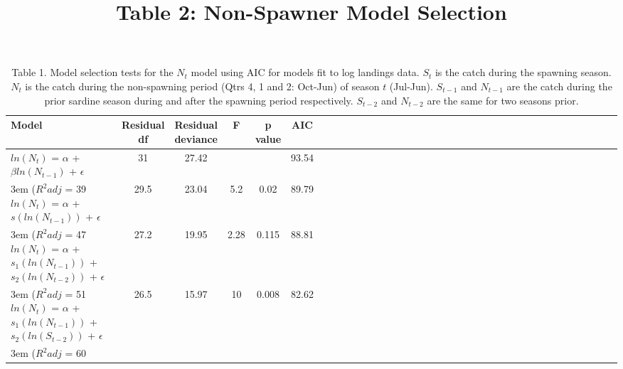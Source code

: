 \documentclass[]{article}
\title{Table 2: Non-Spawner Model Selection}
\author{}
\date{}
\begin{document}
\maketitle

\begin{table}[t]

\caption{\label{tab:print-table2}Table 1. Model selection tests for the $N_t$ model using AIC for models fit to log landings data.  $S_t$ is the catch during the spawning season. $N_t$ is the catch during the non-spawning period (Qtrs 4, 1 and 2: Oct-Jun) of season $t$ (Jul-Jun). $S_{t-1}$ and $N_{t-1}$ are the catch during the prior sardine season during and after the spawning period respectively. $S_{t-2}$ and $N_{t-2}$ are the same for two seasons prior.}
\centering
\begin{tabular}{lccccc|lccccc|lccccc|lccccc|lccccc|lccccc}
\hline
Model & \shortstack{Residual\\df} & \shortstack{Residual\\deviance} & F & \shortstack{p\\value} & AIC\\
\hline
$ln(N_t)$ = $\alpha$ + $\beta ln(N_{t-1})$ + $\epsilon$ & 31 & 27.42 &  &  & 93.54\\
\hline
\kern 3em ($R^2 adj$ = 39%
\hline
$ln(N_t)$ = $\alpha$ + $s(ln(N_{t-1}))$ + $\epsilon$ & 29.5 & 23.04 & 5.2 & 0.02 & 89.79\\
\hline
\kern 3em ($R^2 adj$ = 47%
\hline
$ln(N_t)$ = $\alpha$ + $s_1(ln(N_{t-1}))$ + $s_2(ln(N_{t-2}))$ + $\epsilon$ & 27.2 & 19.95 & 2.28 & 0.115 & 88.81\\
\hline
\kern 3em ($R^2 adj$ = 51%
\hline
$ln(N_t)$ = $\alpha$ + $s_1(ln(N_{t-1}))$ + $s_2(ln(S_{t-2}))$ + $\epsilon$ & 26.5 & 15.97 & 10 & 0.008 & 82.62\\
\hline
\kern 3em ($R^2 adj$ = 60%
\hline
\end{tabular}
\end{table}
\end{document}
